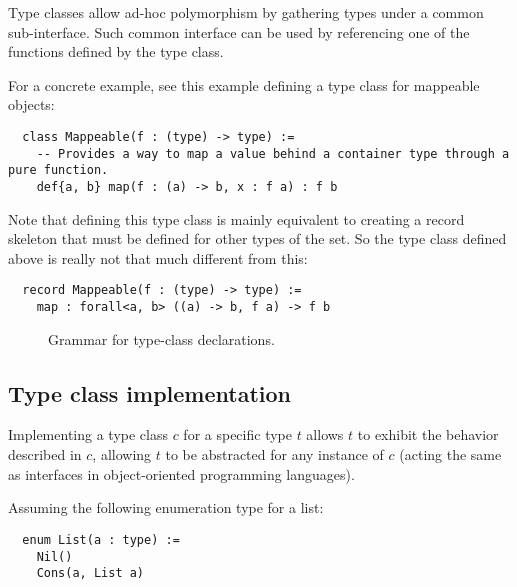 Type classes allow ad-hoc polymorphism by gathering types under a common sub-interface.
Such common interface can be used by referencing one of the functions defined by the type class.

For a concrete example, see this example defining a type class for mappeable objects:

\noindent\begin{verbatim}
  class Mappeable(f : (type) -> type) :=
    -- Provides a way to map a value behind a container type through a pure function.
    def{a, b} map(f : (a) -> b, x : f a) : f b
\end{verbatim}
\vspace*{\baselineskip}

Note that defining this type class is mainly equivalent to creating a record skeleton that must be defined for other types of the set.
So the type class defined above is really not that much different from this:

\noindent\begin{verbatim}
  record Mappeable(f : (type) -> type) :=
    map : forall<a, b> ((a) -> b, f a) -> f b
\end{verbatim}

\begin{figure}[H]
  \centering


  \caption{Grammar for type-class declarations.}
  \label{fig:zilch-grammar-declarations-typeclass-grammar}
\end{figure}

\subsection{Type class implementation}\label{subsec:zilch-grammar-declarations-implementation}

Implementing a type class $c$ for a specific type $t$ allows $t$ to exhibit the behavior described in $c$, allowing $t$ to be abstracted for any instance of $c$ (acting the same as interfaces in object-oriented programming languages).

Assuming the following enumeration type for a list:

\noindent\begin{verbatim}
  enum List(a : type) :=
    Nil()
    Cons(a, List a)
\end{verbatim}
\vspace*{\baselineskip}


